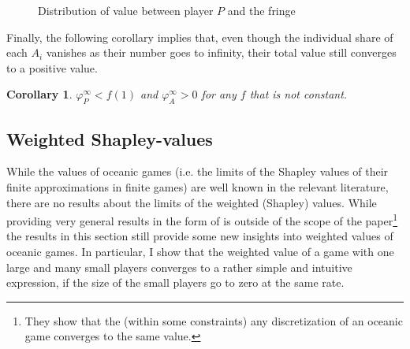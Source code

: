 \documentclass[a4paper]{article}
\newtheorem{corollary}{Corollary}
\begin{document}
\begin{figure}
    \centering
    \caption{Distribution of value between player $P$ and the fringe}
    \label{fig:one_sided}
\end{figure}

Finally, the following corollary implies that, even though the individual share of each $A_i$ vanishes as their number goes to infinity, their total value still converges to a positive value.
\begin{corollary}
    \label{cor:fringe_value_2}
    $\varphi_P^\infty < f(1)$ and $\varphi_A^\infty > 0$ for any $f$ that is not constant.
\end{corollary}


\subsection{Weighted Shapley-values}

While the values of oceanic games (i.e. the limits of the Shapley values of their finite approximations in finite games) are well known in the relevant literature, there are no results about the limits of the weighted (Shapley) values. While providing very general results in the form of \textcite[]{fogelman1980asymptotic} is outside of the scope of the paper\footnote{They show that the (within some constraints) any discretization of an oceanic game converges to the same value.} the results in this section still provide some new insights into weighted values of oceanic games. In particular, I show that the weighted value of a game with one large and many small players converges to a rather simple and intuitive expression, if the size of the small players go to zero at the same rate.
\end{document}
